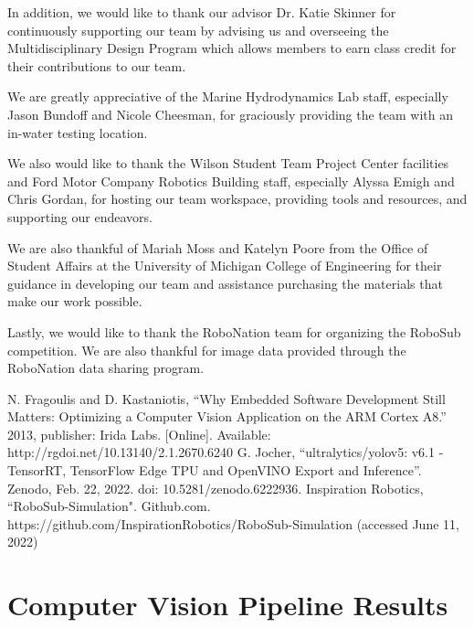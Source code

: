 \documentclass[conference]{IEEEtran}
\begin{document}
In addition, we would like to thank our advisor Dr. Katie Skinner for continuously supporting our team by advising us and overseeing the Multidisciplinary Design Program which allows members to earn class credit for their contributions to our team.

We are greatly appreciative of the Marine Hydrodynamics Lab staff, especially Jason Bundoff and Nicole Cheesman, for graciously providing the team with an in-water testing location. 

We also would like to thank the Wilson Student Team Project Center facilities and Ford Motor Company Robotics Building staff, especially Alyssa Emigh and Chris Gordan, for hosting our team workspace, providing tools and resources, and supporting our endeavors. 

We are also thankful of Mariah Moss and Katelyn Poore from the Office of Student Affairs at the University of Michigan College of Engineering for their guidance in developing our team and assistance purchasing the materials that make our work possible. 

Lastly, we would like to thank the RoboNation team for organizing the RoboSub competition. We are also thankful for image data provided through the RoboNation data sharing program.

\begin{thebibliography}{00}
 N. Fragoulis and D. Kastaniotis, “Why Embedded Software
Development Still Matters: Optimizing a Computer Vision Application
on the ARM Cortex A8.” 2013, publisher: Irida Labs. [Online].
Available: http://rgdoi.net/10.13140/2.1.2670.6240
 G. Jocher, ``ultralytics/yolov5: v6.1 - TensorRT, TensorFlow Edge TPU and OpenVINO Export and Inference”. Zenodo, Feb. 22, 2022. doi: 10.5281/zenodo.6222936.
 Inspiration Robotics, ``RoboSub-Simulation". Github.com. https://github.com/InspirationRobotics/RoboSub-Simulation (accessed June 11, 2022)

\end{thebibliography}

\clearpage
\appendices

\raggedbottom

\pagebreak
\section{Computer Vision Pipeline Results}
\end{document}
